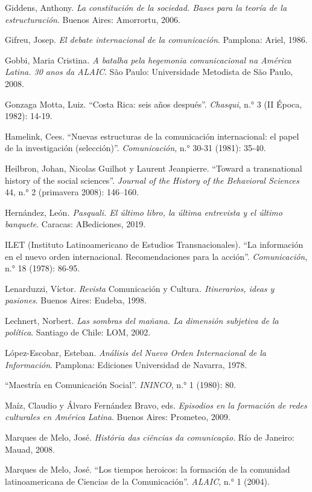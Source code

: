 \documentclass{tufte-handout}
\begin{document}
\begin{hangparas}{.25in}{1}
Giddens, Anthony. \emph{La constitución de la sociedad. Bases para la
teoría de la estructuración}. Buenos Aires: Amorrortu, 2006.

Gifreu, Josep. \emph{El debate internacional de la comunicación}.
Pamplona: Ariel, 1986.

Gobbi, Maria Cristina\emph{. A batalha pela hegemonia comunicacional na
América Latina. 30 anos da ALAIC}. São Paulo: Universidade Metodista de
São Paulo, 2008.

Gonzaga Motta, Luiz. ``Costa Rica: seis años después''. \emph{Chasqui},
n.° 3 (II Época, 1982): 14-19.

Hamelink, Cees. ``Nuevas estructuras de la comunicación internacional:
el papel de la investigación (selección)''. \emph{Comunicación}, n.°
30-31 (1981): 35-40.

Heilbron, Johan, Nicolas Guilhot y Laurent Jeanpierre. ``Toward a
transnational history of the social sciences''. \emph{Journal of the
History of the Behavioral Sciences} 44, n.° 2 (primavera 2008):
146--160.

Hernández, León\emph{. Pasquali. El último libro, la última entrevista y
el último banquete}. Caracas: ABediciones, 2019.

ILET (Instituto Latinoamericano de Estudios Transnacionales). ``La
información en el nuevo orden internacional. Recomendaciones para la
acción''. \emph{Comunicación}, n.° 18 (1978): 86-95.

Lenarduzzi, Víctor. \emph{Revista} Comunicación y Cultura\emph{.
Itinerarios, ideas y pasiones}. Buenos Aires: Eudeba, 1998.

Lechnert, Norbert. \emph{Las sombras del mañana. La dimensión subjetiva
de la política}. Santiago de Chile: LOM, 2002.

López-Escobar, Esteban. \emph{Análisis del Nuevo Orden Internacional de
la Información}. Pamplona: Ediciones Universidad de Navarra, 1978.

``Maestría en Comunicación Social''. \emph{ININCO}, n.° 1 (1980): 80.

Maíz, Claudio y Álvaro Fernández Bravo, eds. \emph{Episodios en la
formación de redes culturales en América Latina}. Buenos Aires:
Prometeo, 2009.

Marques de Melo, José. \emph{História das ciências da comunicação}. Río
de Janeiro: Mauad, 2008.

Marques de Melo, José. ``Los tiempos heroicos: la formación de la
comunidad latinoamericana de Ciencias de la Comunicación''.
\emph{ALAIC}, n.° 1 (2004).


\end{hangparas}
\end{document}

